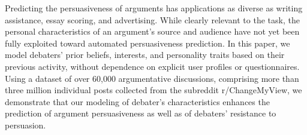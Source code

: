 Predicting the persuasiveness of arguments has applications as diverse as writing assistance, essay scoring, and advertising. While clearly relevant to the task, the personal characteristics of an argument's source and audience have not yet been fully exploited toward automated persuasiveness prediction. In this paper, we model debaters' prior beliefs, interests, and personality traits based on their previous activity, without dependence on explicit user profiles or questionnaires. Using a dataset of over 60,000 argumentative discussions, comprising more than three million individual posts collected from the subreddit r/ChangeMyView, we demonstrate that our modeling of debater's characteristics enhances the prediction of argument persuasiveness as well as of debaters' resistance to persuasion.
